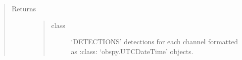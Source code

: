 \documentclass[a4paper,10pt,english]{sphinxmanual}
\begin{document}
\begin{fulllineitems}
\begin{quote}
\begin{description}
\item[{Returns}] \leavevmode
\begin{quote}\begin{description}
\item[{class}] \leavevmode
`DETECTIONS' detections for each channel formatted as    :class: `obspy.UTCDateTime' objects.

\end{description}\end{quote}


\end{description}\end{quote}

\end{fulllineitems}

\end{document}
